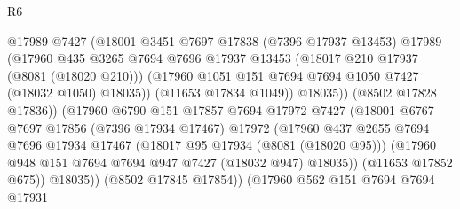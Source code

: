 \begin{lexlean}{R6}
\begin{coremodule}
                                  @17989
                                  @7427
                                  (@18001
                                    @3451
                                    @7697
                                    @17838
                                    (@7396 @17937 @13453)
                                    @17989
                                    (@17960
                                      @435
                                      @3265
                                      @7694
                                      @7696
                                      @17937
                                      @13453
                                      (@18017 @210 @17937 (@8081 (@18020 @210)))
                                      (@17960
                                        @1051
                                        @151
                                        @7694
                                        @7694
                                        @1050
                                        @7427
                                        (@18032 @1050)
                                        @18035))
                                    (@11653 @17834 @1049))
                                  @18035))
                              (@8502 @17828 @17836))
                            (@17960
                              @6790
                              @151
                              @17857
                              @7694
                              @17972
                              @7427
                              (@18001
                                @6767
                                @7697
                                @17856
                                (@7396 @17934 @17467)
                                @17972
                                (@17960
                                  @437
                                  @2655
                                  @7694
                                  @7696
                                  @17934
                                  @17467
                                  (@18017 @95 @17934 (@8081 (@18020 @95)))
                                  (@17960 @948 @151 @7694 @7694 @947 @7427 (@18032 @947) @18035))
                                (@11653 @17852 @675))
                              @18035))
                          (@8502 @17845 @17854))
                        (@17960
                          @562
                          @151
                          @7694
                          @7694
                          @17931

\end{coremodule}
\end{lexlean}
